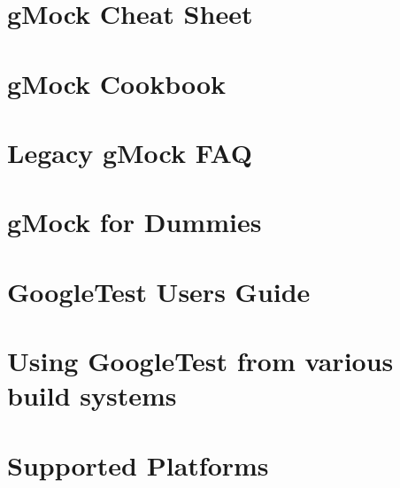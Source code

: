\let\mypdfximage\pdfximage\def\pdfximage{\immediate\mypdfximage}\documentclass[twoside]{book}
\newcommand{\+}{\discretionary{\mbox{\scriptsize$\hookleftarrow$}}{}{}}
\begin{document}
\chapter{g\+Mock Cheat Sheet}
\label{md__home_omar_SEP25_build__deps_googletest_src_docs_gmock_cheat_sheet}

\chapter{g\+Mock Cookbook}
\label{md__home_omar_SEP25_build__deps_googletest_src_docs_gmock_cook_book}

\chapter{Legacy g\+Mock FAQ}
\label{md__home_omar_SEP25_build__deps_googletest_src_docs_gmock_faq}

\chapter{g\+Mock for Dummies}
\label{md__home_omar_SEP25_build__deps_googletest_src_docs_gmock_for_dummies}

\chapter{Google\+Test User\textquotesingle{}s Guide}
\label{md__home_omar_SEP25_build__deps_googletest_src_docs_index}

\chapter{Using Google\+Test from various build systems}
\label{md__home_omar_SEP25_build__deps_googletest_src_docs_pkgconfig}

\chapter{Supported Platforms}
\label{md__home_omar_SEP25_build__deps_googletest_src_docs_platforms}

\end{document}
